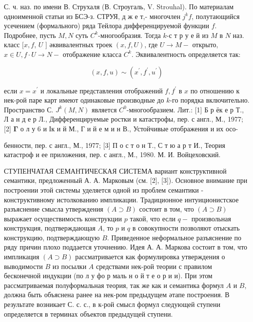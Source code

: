 \documentclass[10pt]{article}
\begin{document}
С. ч. наз. по имени В. Струхаля (В. Строугаль, V. Strouhal). По материалам одноименной статьи из БСЭ-з. СТРУЯ, д ж е т,- многочлен $j^{k} f$, полутающийся усечением (формального) ряда Тейлора дифференцируемой функции $f$. Подробнее, пусть $M, N$ суть $C^{k}$-многообразия. Тогда $k$-с т р у е й из $M$ в $N$ наз. класс $[x, f$, $U$ ] әквивалентных троек $(x, f, U)$, где $U \rightarrow M-$ открыто, $x \in U, f \cdot U \rightarrow N-$ отображение класса $C^{k}$. Эквивалентность определяется так:



\[

(x, f, u) \sim\left(x^{\prime}, f^{\prime}, u^{\prime}\right)

\]



если $x=x^{\prime}$ и локальные представления отображений $f, f^{\prime}$ в $x$ по отношению к нек-рой паре карт имеют одинаковые производные до $k$-го порядка включительно. Пространство С. $J^{k}(M, N)$ является $C^{0}$-многообразием. Лит.: [1] Б р ёк е р Т., Л а н д е р Л., Дифференцируемые ростки и катастрофы, пер. с англ., М., 1977; [2] $\boldsymbol{\Gamma}$ о л у 6 и Ік и й М., Г и й е м и н В., Устойчивые отображения и их осо-

бенности, пер. с англ., М., 1977; [3] П о с т о н Т., С т ю а р т И., Теория катастроф и ее приложения, пер. с англ., М., 1980. М. И. Войцеховский.



СТУПЕНЧАТАЯ СЕМАНТИЧЕСКАЯ СИСТЕМА вариант конструктивной семантики, предложенный А. А. Марковым (см. [2], [3]). Основное внимание при построении этой системы уделяется одной из проблем семантики - конструктивному истолкованию импликации. Традиционное интуиционистское разъяснение смысла утверждения $(A \supset B)$ состоит в том, что $(A \supset B)$ выражает осуществимость конструкции $p$ такой, что если $q-$ произвольная конструкция, подтверждающая $A$, то $p$ и $q$ в совокупности позволяют отыскать конструкцию, подтверждающую $B$. Приведенное неформальное разъяснение по ряду причин плохо поддается уточнению. Идея А. А. Маркова состоит в том, что импликация $(A \supset B)$ рассматривается как формулировка утверждения о выводимости $B$ из посылки $A$ средствами нек-рой теории с правилом бесконечной индукции (по л у фо р маль н о й т е о р и и). При этом рассматриваемая полуформальная теория, так же как и семантика формул $A$ и $B$, должна быть объяснена ранее на нек-ром предыдущем әтапе построения. В результате возникает С. с. с., в к-рой смысл формул следующей ступени определяется в терминах объектов предыдущей ступени.
\end{document}
